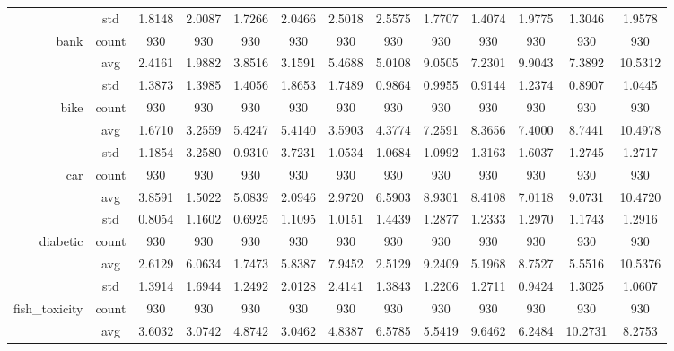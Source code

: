 \begin{table}[htbp]
{\begin{tabular}{rcccccccccccc}
          & std   & 1.8148 & 2.0087 & 1.7266 & 2.0466 & 2.5018 & 2.5575 & 1.7707 & 1.4074 & 1.9775 & 1.3046 & 1.9578 \\
    bank  & count & 930   & 930   & 930   & 930   & 930   & 930   & 930   & 930   & 930   & 930   & 930 \\
          & avg   & 2.4161 & \cellcolor[rgb]{ .776,  .937,  .808}\textcolor[rgb]{ 0,  .38,  0}{1.9882} & 3.8516 & 3.1591 & 5.4688 & 5.0108 & 9.0505 & 7.2301 & 9.9043 & 7.3892 & 10.5312 \\
          & std   & 1.3873 & 1.3985 & 1.4056 & 1.8653 & 1.7489 & 0.9864 & 0.9955 & 0.9144 & 1.2374 & 0.8907 & 1.0445 \\
    bike  & count & 930   & 930   & 930   & 930   & 930   & 930   & 930   & 930   & 930   & 930   & 930 \\
          & avg   & \cellcolor[rgb]{ .776,  .937,  .808}\textcolor[rgb]{ 0,  .38,  0}{1.6710} & 3.2559 & 5.4247 & 5.4140 & 3.5903 & 4.3774 & 7.2591 & 8.3656 & 7.4000 & 8.7441 & 10.4978 \\
          & std   & 1.1854 & 3.2580 & 0.9310 & 3.7231 & 1.0534 & 1.0684 & 1.0992 & 1.3163 & 1.6037 & 1.2745 & 1.2717 \\
    car   & count & 930   & 930   & 930   & 930   & 930   & 930   & 930   & 930   & 930   & 930   & 930 \\
          & avg   & 3.8591 & \cellcolor[rgb]{ .776,  .937,  .808}\textcolor[rgb]{ 0,  .38,  0}{1.5022} & 5.0839 & 2.0946 & 2.9720 & 6.5903 & 8.9301 & 8.4108 & 7.0118 & 9.0731 & 10.4720 \\
          & std   & 0.8054 & 1.1602 & 0.6925 & 1.1095 & 1.0151 & 1.4439 & 1.2877 & 1.2333 & 1.2970 & 1.1743 & 1.2916 \\
    diabetic & count & 930   & 930   & 930   & 930   & 930   & 930   & 930   & 930   & 930   & 930   & 930 \\
          & avg   & 2.6129 & 6.0634 & \cellcolor[rgb]{ .776,  .937,  .808}\textcolor[rgb]{ 0,  .38,  0}{1.7473} & 5.8387 & 7.9452 & 2.5129 & 9.2409 & 5.1968 & 8.7527 & 5.5516 & 10.5376 \\
          & std   & 1.3914 & 1.6944 & 1.2492 & 2.0128 & 2.4141 & 1.3843 & 1.2206 & 1.2711 & 0.9424 & 1.3025 & 1.0607 \\
    fish\_toxicity & count & 930   & 930   & 930   & 930   & 930   & 930   & 930   & 930   & 930   & 930   & 930 \\
          & avg   & 3.6032 & 3.0742 & 4.8742 & \cellcolor[rgb]{ .776,  .937,  .808}\textcolor[rgb]{ 0,  .38,  0}{3.0462} & 4.8387 & 6.5785 & 5.5419 & 9.6462 & 6.2484 & 10.2731 & 8.2753 \\

\end{tabular}}
\end{table}
